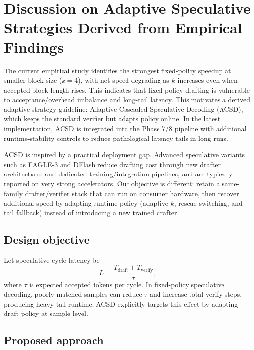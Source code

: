 \section{Discussion on Adaptive Speculative Strategies Derived from Empirical Findings}
\label{sec:acsd}

The current empirical study identifies the strongest fixed-policy speedup at
smaller block size ($k{=}4$), with net speed degrading as $k$ increases even
when accepted block length rises. This indicates that fixed-policy drafting is
vulnerable to acceptance/overhead imbalance and long-tail latency. This
motivates a derived adaptive strategy guideline:
Adaptive Cascaded Speculative Decoding (ACSD), which keeps the standard
verifier but adapts policy online. In the latest implementation, ACSD is
integrated into the Phase 7/8 pipeline with additional runtime-stability
controls to reduce pathological latency tails in long runs.

ACSD is inspired by a practical deployment gap. Advanced speculative variants
such as EAGLE-3 and DFlash reduce drafting cost through new drafter
architectures and dedicated training/integration pipelines, and are typically
reported on very strong accelerators. Our objective is different: retain a
same-family drafter/verifier stack that can run on consumer hardware, then
recover additional speed by adapting runtime policy (adaptive $k$, rescue
switching, and tail fallback) instead of introducing a new trained drafter.

\subsection{Design objective}

Let speculative-cycle latency be
\begin{equation}
  L = \frac{T_{\text{draft}} + T_{\text{verify}}}{\tau},
\end{equation}
where $\tau$ is expected accepted tokens per cycle. In fixed-policy speculative
decoding, poorly matched samples can reduce $\tau$ and increase total verify
steps, producing heavy-tail runtime. ACSD explicitly targets this effect by
adapting draft policy at sample level.

\subsection{Proposed approach}

